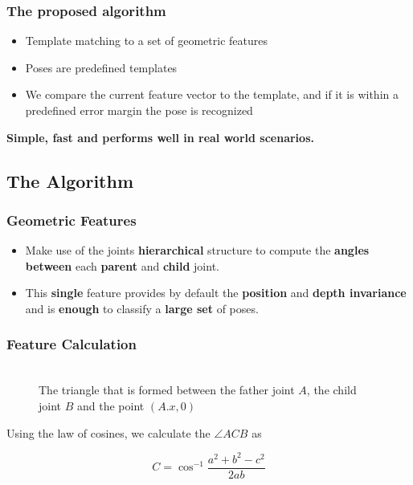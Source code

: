 \begin{frame}
\frametitle{The proposed algorithm}

\begin{itemize}
\item Template matching to a set of geometric features
\item Poses are predefined templates
\item We compare the current feature vector to the template, and if it is within a predefined error margin the pose is recognized
\end{itemize}

\begin{center}
\textbf{Simple, fast and performs well in real world scenarios.}
\end{center}

\end{frame}



\subsection{The Algorithm}

\begin{frame}
\frametitle{Geometric Features}

\begin{itemize}
\item Make use of the joints \textbf{hierarchical} structure to compute the \textbf{angles between} each \textbf{parent} and \textbf{child} joint.

\item This \textbf{single} feature provides by default the \textbf{position} and \textbf{depth invariance} and is \textbf{enough} to classify a \textbf{large set} of poses.
\end{itemize}
\end{frame}

\begin{frame}
\frametitle{Feature Calculation}


\begin{figure}[!htb]
\centering
\resizebox{0.3\linewidth}{!} {
}\\
\small The triangle that is formed between the father joint $A$, the child joint $B$ and the point $(A.x, 0)$
 \end{figure}

Using the law of cosines, we calculate the $\angle{ACB}$ as

\begin{equation}
C=\cos^{-1}\frac{a^2+b^2-c^2}{2ab}
\end{equation}

\end{frame}

